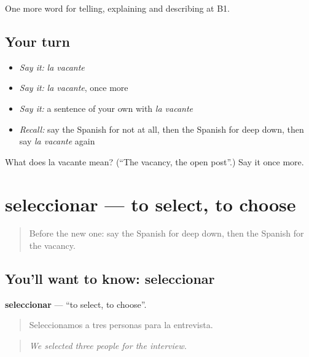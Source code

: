 \begin{grammarlens}[title={What you've built}]
One more word for telling, explaining and describing at B1.
\end{grammarlens}

\subsection*{Your turn}
\begin{itemize}
\raggedright
  \item \emph{Say it:} \emph{la vacante}
  \item \emph{Say it:} \emph{la vacante}, once more
  \item \emph{Say it:} a sentence of your own with \emph{la vacante}
  \item \emph{Recall:} say the Spanish for not at all, then the Spanish for deep down, then say \emph{la vacante} again
\end{itemize}

\begin{tcolorbox}[breakable,colback=teal!4,colframe=teal!35!black,title={Before you move on}]
What does la vacante mean? (\textquotedblleft{}The vacancy, the open post\textquotedblright{}.) Say it once more.
\end{tcolorbox}
\section[seleccionar]{seleccionar — to select, to choose}

\label{lesson:ES-C590-seleccionar}



\begin{quote}
Before the new one: say the Spanish for deep down, then the Spanish for the vacancy.
\end{quote}

\subsection*{You'll want to know: seleccionar}
\textbf{seleccionar} — \textquotedblleft{}to select, to choose\textquotedblright{}.

\begin{quote}
Seleccionamos a tres personas para la entrevista.
\end{quote}

\begin{quote}
\emph{We selected three people for the interview.}
\end{quote}

